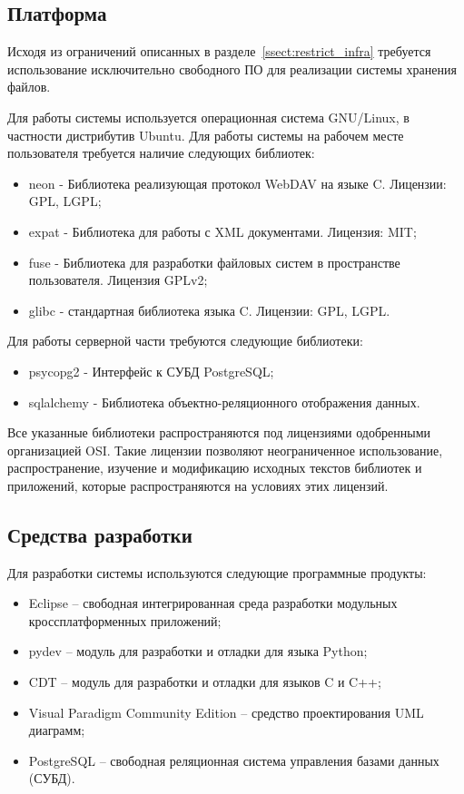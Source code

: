 \documentclass[utf8,usehyperref,12pt]{G7-32}
\begin{document}
\subsection{Платформа}\label{ssect:platform}
Исходя из ограничений описанных в разделе~\ref{ssect:restrict_infra} требуется использование исключительно свободного ПО для реализации системы хранения файлов. 

Для работы системы используется операционная система GNU/Linux, в частности дистрибутив Ubuntu. Для работы системы на рабочем месте пользователя требуется наличие следующих библиотек:

\begin{itemize}
 \item neon\cite{neon} - Библиотека реализующая протокол WebDAV\cite{webdav_wiki}\cite{webdav_rfc} на языке C. Лицензии: GPL, LGPL;
 \item expat - Библиотека для работы с XML документами. Лицензия: MIT;
 \item fuse - Библиотека для разработки файловых систем в пространстве пользователя\cite{fuse}\cite{fuse_wiki}. Лицензия GPLv2;
 \item glibc - стандартная библиотека языка C. Лицензии: GPL, LGPL.
\end{itemize}

Для работы серверной части требуются следующие библиотеки:

\begin{itemize}
 \item psycopg2 - Интерфейс к СУБД PostgreSQL;
 \item sqlalchemy - Библиотека объектно-реляционного отображения данных\cite{sqlalchemy}.
\end{itemize}

Все указанные библиотеки распространяются под лицензиями одобренными организацией OSI. Такие лицензии позволяют неограниченное использование, распространение, изучение и модификацию исходных текстов библиотек и приложений, которые распространяются на условиях этих лицензий.

\subsection{Средства разработки}

Для разработки системы используются следующие программные продукты:
\begin{itemize}
 \item Eclipse -- свободная интегрированная среда разработки модульных кроссплатформенных приложений;
 \item pydev -- модуль для разработки и отладки для языка Python;
 \item CDT -- модуль для разработки и отладки для языков C и C++;
 \item Visual Paradigm Community Edition -- средство проектирования UML\cite{uml_book} диаграмм;
 \item PostgreSQL -- свободная реляционная система управления базами данных (СУБД)\cite{pg_book}.  
\end{itemize}
\end{document}
